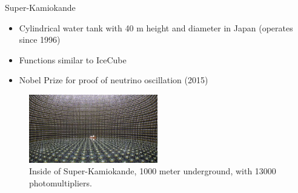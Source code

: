\documentclass[aspectratio=1610, 10pt]{beamer}
\begin{document}
\begin{frame}{Super-Kamiokande}
  \begin{itemize}
    \item Cylindrical water tank with 40 m height and diameter in Japan (operates since 1996)
    \medskip
    \item Functions similar to IceCube
    \medskip
    \item Nobel Prize for proof of neutrino oscillation (2015)
  \end{itemize}
  \begin{figure}
    \includegraphics[width=0.5\textwidth]{images/kamiokande.png}
    \caption{Inside of Super-Kamiokande, 1000 meter underground, with 13000 photomultipliers.}
  \end{figure}
\end{frame}




\end{document}
